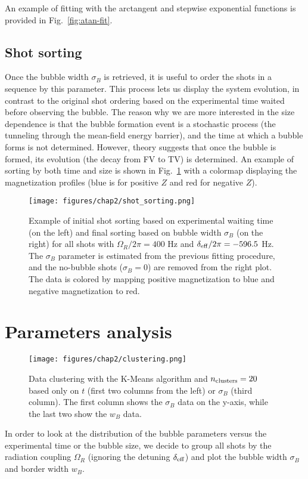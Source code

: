 An example of fitting with the arctangent and stepwise exponential functions is provided in Fig.\ \ref{fig:atan-fit}.

\subsection{Shot sorting}
Once the bubble width $\sigma_B$ is retrieved, it is useful to order the shots in a sequence by this parameter. This process lets us display the system evolution, in contrast to the original shot ordering based on the experimental time waited before observing the bubble. The reason why we are more interested in the size dependence is that the bubble formation event is a stochastic process (the tunneling through the mean-field energy barrier), and the time at which a bubble forms is not determined. However, theory suggests that once the bubble is formed, its evolution (the decay from FV to TV) is determined. 
An example of sorting by both time and size is shown in Fig.\ \ref{fig:sorting} with a colormap displaying the magnetization profiles (blue is for positive $Z$ and red for negative $Z$).

\begin{figure}[ht!]
    \centering
    \texttt{[image: figures/chap2/shot\_sorting.png]}
    \caption{Example of initial shot sorting based on experimental waiting time (on the left) and final sorting based on bubble width $\sigma_B$ (on the right) for all shots with $\Omega_R/2\pi = 400$ \unit{\hertz} and $\delta_{\rm eff}/2\pi = -596.5$ \unit{\hertz}. The $\sigma_B$ parameter is estimated from the previous fitting procedure, and the no-bubble shots ($\sigma_B = 0$) are removed from the right plot. The data is colored by mapping positive magnetization to blue and negative magnetization to red.}
    \label{fig:sorting}
\end{figure}

\section{Parameters analysis}
\label{sec:params}
\begin{figure}[ht!]
    \centering
    \texttt{[image: figures/chap2/clustering.png]}
    \caption{Data clustering with the K-Means algorithm and $n_{\rm clusters} = 20$ based only on $t$ (first two columns from the left) or $\sigma_B$ (third column). The first column shows the $\sigma_B$ data on the y-axis, while the last two show the $w_B$ data.}
    \label{fig:clust}
\end{figure} 
In order to look at the distribution of the bubble parameters versus the experimental time or the bubble size, we decide to group all shots by the radiation coupling $\Omega_R$ (ignoring the detuning $\delta_{\rm eff}$) and plot the bubble width $\sigma_B$ and border width $w_B$. 

